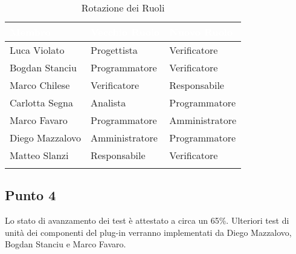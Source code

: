 \begin{center}
	\begin{longtable}[c]{|m{}|m{}|m{}|} 
		\hline
		\rowcolor{bluelogo}\textbf{\textcolor{white}{Membro}} & \textbf{\textcolor{white}{Vecchio Ruolo}} & \textbf{\textcolor{white}{Nuovo Ruolo}}\\
		\hline
		\hline
		Luca Violato & Progettista & Verificatore \\
		\hline
		\rowcolor{grigio}Bogdan Stanciu & Programmatore & Verificatore \\
		\hline
		Marco Chilese & Verificatore & Responsabile\\
		\hline
		\rowcolor{grigio}Carlotta Segna & Analista & Programmatore\\
		\hline
		Marco Favaro & Programmatore & Amministratore \\
		\hline
		\rowcolor{grigio} Diego Mazzalovo & Amministratore & Programmatore\\
		\hline
		Matteo Slanzi & Responsabile & Verificatore\\
		\hline
		\caption{Rotazione dei Ruoli}
	\end{longtable}

\end{center}

\subsection{Punto 4}
Lo stato di avanzamento dei test è attestato a circa un 65\%. Ulteriori test di unità dei componenti del plug-in verranno implementati da Diego Mazzalovo, Bogdan Stanciu e Marco Favaro.
